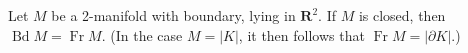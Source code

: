 Let $M$ be a 2-manifold with boundary, lying in $\mathbf{R}^2$. If $M$ is closed, then $\operatorname{Bd} M = \operatorname{Fr} M$. (In the case $M = |K|$, it then follows that $\operatorname{Fr} M = |\partial K|$.)
